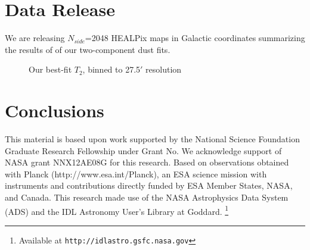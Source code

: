 \documentclass{emulateapj}
\begin{document}
\section{Data Release}
\label{sec:release}
We are releasing $N_{side}$=2048 HEALPix maps in Galactic coordinates 
summarizing the results of of our two-component dust fits.



\begin{figure*} [ht]
\begin{center}
\caption{Our best-fit $T_2$, binned to 27.5$'$ resolution}
\end{center}
\end{figure*}

\section{Conclusions}
\label{sec:conclusion}


This material is based upon work supported by the National Science Foundation 
Graduate Research Fellowship under Grant No. We acknowledge support of NASA 
grant NNX12AE08G for this research. Based on observations obtained with Planck 
(http://www.esa.int/Planck), an ESA science mission with instruments and 
contributions directly funded by ESA Member States, NASA, and Canada. This 
research made use of the NASA Astrophysics Data System (ADS) and the IDL 
Astronomy User's Library at Goddard. \footnote{Available at 
\texttt{http://idlastro.gsfc.nasa.gov}}



\end{document}

